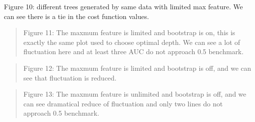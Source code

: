 \documentclass{article}
\newcommand{\ciapdf}[1]{\vspace*{-\parskip}\begin{center}\resizebox{0.75\textwidth}{!}{\texttt{[image: \#1]}}\end{center}}
\begin{document}
\vspace*{-\parskip}

Figure 10:
different trees generated by same data with limited max feature. We can see
there is a tie in the cost function values.

\ciapdf{app_samedata_1.pdf}

\ciapdf{app_samedata_2.pdf}

\ciapdf{Figure_8.pdf}
\begin{quote}
Figure 11: The maxmum feature is limited and bootstrap is on, this is
exactly the same plot used to choose optimal depth. We can see a lot of
fluctuation here and at least three AUC do not approach 0.5 benchmark.
\end{quote}

\ciapdf{Figure_9.pdf}
\begin{quote}
Figure 12: The maxmum feature is limited and bootstrap is off, and we can
see that fluctuation is reduced.
\end{quote}

\ciapdf{Figure_10.pdf}
\begin{quote}
Figure 13: The maxmum feature is unlimited and bootstrap is off, and we
can see dramatical reduce of fluctuation and only two lines do not
approach 0.5 benchmark.
\end{quote}
\end{document}
